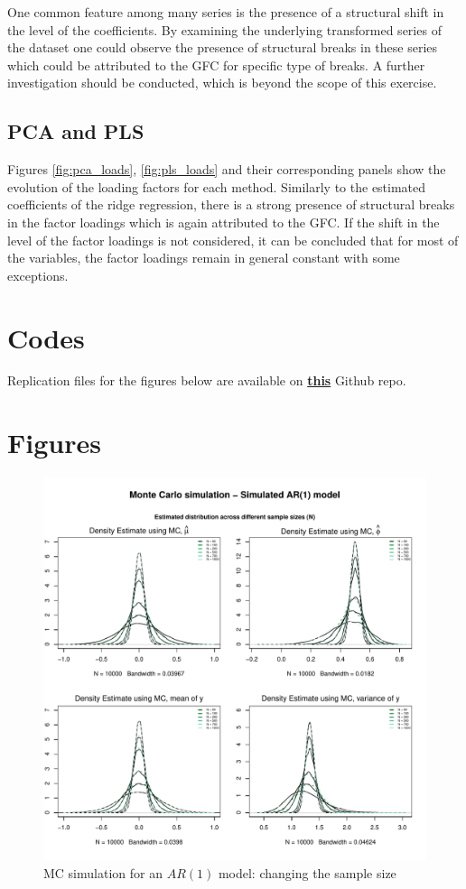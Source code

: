 \documentclass{article}
\begin{document}
\par One common feature among many series is the presence of a structural shift in the level of the coefficients. By examining the underlying transformed series of the dataset one could observe the presence of structural breaks in these series which could be attributed to the GFC for specific type of breaks. A further investigation should be conducted, which is beyond the scope of this exercise.

\subsection{PCA and PLS}
Figures \ref{fig:pca_loads}, \ref{fig:pls_loads} and their corresponding panels show the evolution of the loading factors for each method. Similarly to the estimated coefficients of the ridge regression, there is a strong presence of structural breaks in the factor loadings which is again attributed to the GFC. If the shift in the level of the factor loadings is not considered, it can be concluded that for most of the variables, the factor loadings remain in general constant with some exceptions.  


\clearpage
\appendix
\section{Codes}
Replication files for the figures below are available on \href{https://github.com/szlatanos/2021-10-29_TSW_Assignment}{\textbf{this}} Github repo.

\section{Figures}
\begin{figure}[hbt!]
\includegraphics[width=\textwidth]{plots/MC_AR1_densities_diff_smpl}
\caption{MC simulation for an $AR(1)$ model: changing the sample size}
\label{fig:MC_AR1_densities_diff_smpl}
\centering
\end{figure}
\end{document}
